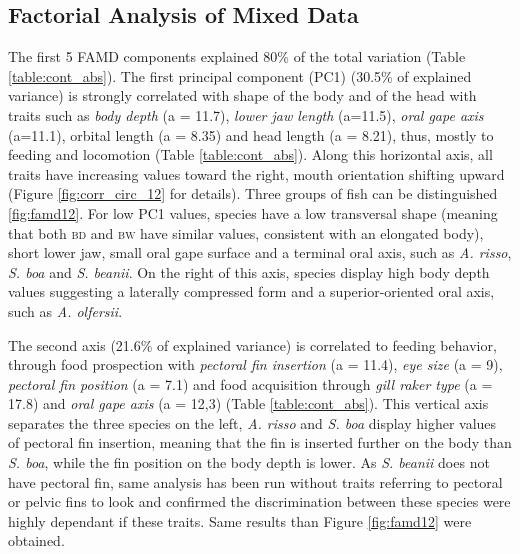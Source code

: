 
\subsection{Factorial Analysis of Mixed Data}
The first 5 FAMD components explained 80\% of the total variation (Table \ref{table:cont_abs}). The first principal component (PC1) (30.5\% of explained variance) is strongly correlated with shape of the body and of the head with traits such as \emph{body depth} (a = 11.7), \emph{lower jaw length} (a=11.5), \emph{oral gape axis} (a=11.1), orbital length (a = 8.35) and head length (a = 8.21), thus, mostly to feeding and locomotion (Table \ref{table:cont_abs}). Along this horizontal axis, all traits have increasing values toward the right, mouth orientation shifting upward (Figure \ref{fig:corr_circ_12} for details). Three groups of fish can be distinguished \ref{fig:famd12}. For low PC1 values, species have a low transversal shape (meaning that both \textsc{bd} and \textsc{bw} have similar values, consistent with an elongated body), short lower jaw, small oral gape surface and a terminal oral axis, such as \textit{A. risso}, \textit{S. boa} and \textit{S. beanii}. On the right of this axis, species display high body depth values suggesting a laterally compressed form and a superior-oriented oral axis, such as \textit{A. olfersii}. 

The second axis (21.6\% of explained variance) is correlated to feeding behavior, through food prospection with \emph{pectoral fin insertion} (a = 11.4), \emph{eye size} (a = 9), \emph{pectoral fin position} (a = 7.1) and food acquisition through \emph{gill raker type} (a = 17.8) and \emph{oral gape axis} (a = 12,3) (Table \ref{table:cont_abs}). This vertical axis separates the three species on the left, \textit{A. risso} and \textit{S. boa} display higher values of pectoral fin insertion, meaning that the fin is inserted further on the body than \textit{S. boa}, while the fin position on the body depth is lower. As \textit{S. beanii} does not have pectoral fin, same analysis has been run without traits referring to pectoral or pelvic fins to look and confirmed the discrimination between these species were highly dependant if these traits. Same results than Figure \ref{fig:famd12} were obtained.

